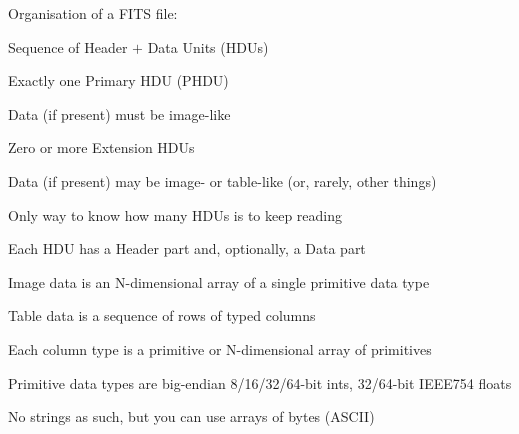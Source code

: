 \documentclass[20pt,landscape]{foils}
\begin{document}
\begin{list0}
  \item Organisation of a FITS file:
  \begin{list2}
    \item Sequence of Header $+$ Data Units (HDUs)
\vspace*{-0.2cm}
    \begin{list3}
      \item Exactly one Primary HDU (PHDU)
      \begin{list4}
\vspace*{-0.2cm}
        \item Data (if present) must be image-like
\vspace*{-0.2cm}
      \end{list4}
      \item Zero or more Extension HDUs
      \begin{list4}
\vspace*{-0.2cm}
        \item Data (if present) may be image- or table-like
              (or, rarely, other things)
\vspace*{-0.2cm}
      \end{list4}
      \item Only way to know how many HDUs is to keep reading
    \end{list3}
\vspace*{-0.2cm}
    \item Each HDU has a Header part and, optionally, a Data part
\vspace*{-0.2cm}
    \item Image data is an N-dimensional array of a single primitive data type
\vspace*{-0.2cm}
    \item Table data is a sequence of rows of typed columns
\vspace*{-0.2cm}
    \begin{list3}
      \item Each column type is a primitive or N-dimensional array of primitives
    \end{list3}
\vspace*{-0.2cm}
    \item Primitive data types are big-endian 8/16/32/64-bit ints,
                                              32/64-bit IEEE754 floats
    \begin{list3}
      \item No strings as such, but you can use arrays of bytes (ASCII)

\end{list3}
\end{list2}
\end{list0}
\end{document}

